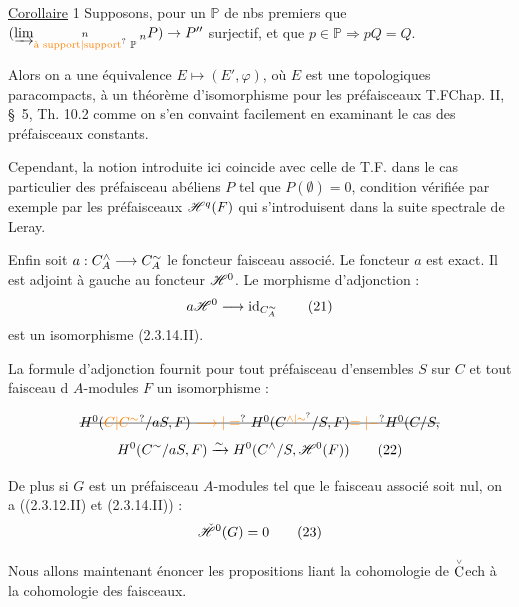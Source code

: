 \uline{Corollaire} 1 Supposons, pour un $\mathbb P$ de nbs premiers que $(\varinjlim_{\substack{n\\\text{\unsure{à support|support} }\mathbb P}}{}_nP)\to P''$ surjectif, et que $p\in\mathbb P\Rightarrow pQ=Q$.

Alors on a une équivalence $E\mapsto(E',\varphi)$, où $E$ est une
topologiques paracompacts, à un théorème d'isomorphisme pour les  préfaisceaux \handwritten{[}T.F\quad Chap. II, \S~5, Th. 10.2\handwritten{]} comme on s'en convaint facilement en examinant le cas des préfaisceaux constants.

Cependant, la notion introduite ici coincide avec celle de \handwritten{[}T.F.\handwritten{]} dans le cas particulier des préfaisceau abéliens $P$ tel que $P(\emptyset)=0$, condition vérifiée par exemple par les préfaisceaux $\mathscr H^q(F)$  qui s'introduisent dans la suite spectrale de Leray.

Enfin soit  $a:C_A^{\wedge}\longrightarrow C_A^{\sim}$ le foncteur faisceau associé. Le foncteur $a$ est exact. Il est adjoint à gauche au foncteur $\mathscr H^0$. Le morphisme d'adjonction :
\[
a\mathscr H^0\longrightarrow\operatorname{id}_{C_A^{\sim}}\tag*{(21)}
\]
est un isomorphisme (2.3.14.II).

La formule d'adjonction fournit pour tout préfaisceau d'ensembles $S$ sur $C$ et tout faisceau d $A$-modules $F$ un isomorphisme :

\[
\deleted{H^0(\unsure{C|C^{\sim}}/aS,F)\ \unsure{\longrightarrow|=}\ H^0(C^{\unsure{\wedge|\sim}}/S,F)\unsure{=|-}H^0(C/S,}
\]
\[
H^0(C^{\sim}/aS,F)\xrightarrow{\sim}H^0(C^{\wedge}/S,\mathscr H^0(F))\tag*{(22)}
\]

De plus si $G$ est un préfaisceau  $A$-modules tel que le faisceau associé soit nul, on a ((2.3.12.II) et (2.3.14.II)) :
\[
\check{\mathscr H}^{0}(G)=0\tag*{(23)}
\]

Nous allons maintenant énoncer les propositions liant la cohomologie de $\overset{\scriptscriptstyle\vee}{\text{C}}$ech à la cohomologie des faisceaux.

